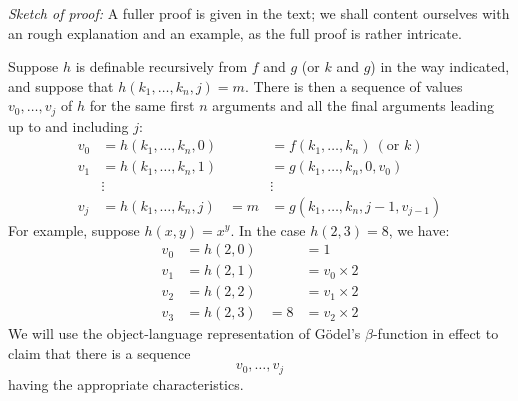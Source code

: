 \documentclass[12pt]{report}
\theoremstyle{nonumberplain}
\begin{document}
\noindent\emph{Sketch of proof:} A fuller proof is given in the text; we shall content ourselves with an rough explanation and an example, as the full proof is rather intricate.

Suppose $h$ is definable recursively from $f$ and $g$ (or $k$ and $g$) in the way indicated, and suppose that $h(k_1, \dotsc, k_n, j) = m$. There is then a sequence of values $v_0, \dotsc, v_j$ of $h$ for the same first $n$ arguments and all the final arguments leading up to and including $j$:
\begin{align*}
v_0 &= h(k_1, \dotsc, k_n, 0) & & = f(k_1, \dotsc, k_n)\ (\text{or }k)\\
v_1 &= h(k_1, \dotsc, k_n, 1) & & = g(k_1, \dotsc, k_n, 0, v_0)\\
&\vdots && \vdots\\
v_j &= h(k_1, \dotsc, k_n, j) & =m& = g(k_1, \dotsc, k_n, j-1, v_{j-1})
\end{align*}
For example, suppose $h(x,y) = x^y$. In the case $h(2,3) = 8$, we have:
\begin{align*}
v_0 &= h(2,0) &&= 1\\
v_1 &= h(2,1) &&= v_0 \times 2\\
v_2 &= h(2,2) &&= v_1 \times 2\\
v_3 &= h(2,3) &=8&= v_2 \times 2
\end{align*}
We will use the object-language representation of G\"odel's $β$-function in effect to claim that there is a sequence \[ v_0, \dotsc, v_j \] having the appropriate characteristics.
\end{document}
